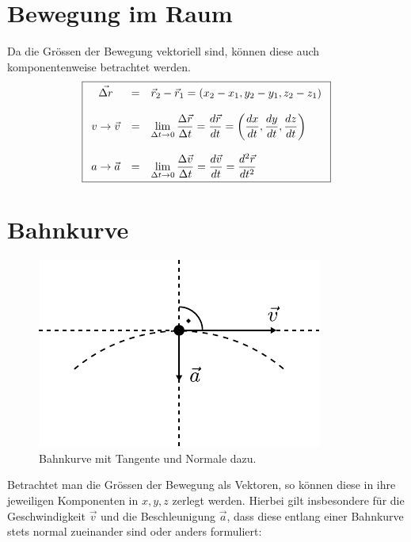 \section{Bewegung im Raum}
Da die Grössen der Bewegung vektoriell sind, können diese auch 
komponentenweise betrachtet werden.
\[ \boxed{\begin{array}{c c l}
	\vec{\Delta r} 
		&=& \vec{r}_2-\vec{r}_1
		= (x_2-x_1,y_2-y_1,z_2-z_1) \\
	& \\
	v \rightarrow \vec{v} 
		&=& \displaystyle \lim\limits_{\Delta t \rightarrow 0}
			{\frac{\Delta \vec{r}}{\Delta t}}
		= \displaystyle \frac{d\vec{r}}{dt}
		= \displaystyle
		\left(\frac{dx}{dt},\frac{dy}{dt},\frac{dz}{dt}\right) \\
	& \\
	a \rightarrow \vec{a} 
		&=& \displaystyle \lim\limits_{\Delta t \rightarrow 0}
			{\frac{\Delta \vec{v}}{\Delta t}}
		= \displaystyle \frac{d\vec{v}}{dt}
		= \displaystyle \frac{d^2\vec{r}}{dt^2}
\end{array}}\]
		
\section{Bahnkurve}

\begin{figure}[h!]
	\centering
	\includegraphics[scale=0.8]{bahnkurve.pdf}
	\caption{Bahnkurve mit Tangente und Normale dazu.}
	\label{fig:bahnkurve}
\end{figure}

\noindent
Betrachtet man die Grössen der Bewegung als Vektoren, so können diese 
in ihre jeweiligen Komponenten in $x,y,z$ zerlegt werden. Hierbei gilt 
insbesondere für die Geschwindigkeit $\vec{v}$ und die Beschleunigung
$\vec{a}$, dass diese entlang einer Bahnkurve stets normal zueinander 
sind oder anders formuliert:

